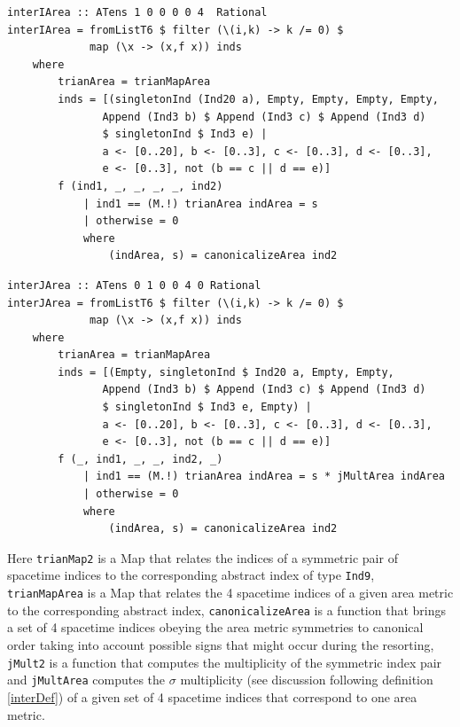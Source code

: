 \documentclass[a4paper,12pt, DIV=14, BCOR=5mm, twoside, headsepline]{scrbook}
\begin{document}
\begin{samepage}
\begin{verbatim}
interIArea :: ATens 1 0 0 0 0 4  Rational
interIArea = fromListT6 $ filter (\(i,k) -> k /= 0) $
             map (\x -> (x,f x)) inds
    where
        trianArea = trianMapArea
        inds = [(singletonInd (Ind20 a), Empty, Empty, Empty, Empty,
               Append (Ind3 b) $ Append (Ind3 c) $ Append (Ind3 d) 
               $ singletonInd $ Ind3 e) |
               a <- [0..20], b <- [0..3], c <- [0..3], d <- [0..3],
               e <- [0..3], not (b == c || d == e)]
        f (ind1, _, _, _, _, ind2)
            | ind1 == (M.!) trianArea indArea = s
            | otherwise = 0
            where
                (indArea, s) = canonicalizeArea ind2
\end{verbatim} 
\end{samepage}

\begin{samepage}
\begin{verbatim}
interJArea :: ATens 0 1 0 0 4 0 Rational
interJArea = fromListT6 $ filter (\(i,k) -> k /= 0) $
             map (\x -> (x,f x)) inds
    where
        trianArea = trianMapArea
        inds = [(Empty, singletonInd $ Ind20 a, Empty, Empty,
               Append (Ind3 b) $ Append (Ind3 c) $ Append (Ind3 d)
               $ singletonInd $ Ind3 e, Empty) |
               a <- [0..20], b <- [0..3], c <- [0..3], d <- [0..3],
               e <- [0..3], not (b == c || d == e)]
        f (_, ind1, _, _, ind2, _)
            | ind1 == (M.!) trianArea indArea = s * jMultArea indArea
            | otherwise = 0
            where
                (indArea, s) = canonicalizeArea ind2
\end{verbatim} 
\end{samepage}

Here \texttt{trianMap2} is a Map that relates the indices of a symmetric pair of spacetime indices to the corresponding abstract index of type \texttt{Ind9}, \texttt{trianMapArea} is a Map that relates the 4 spacetime indices of a given area metric to the corresponding abstract index, \texttt{canonicalizeArea} is a function that brings a set of 4 spacetime indices obeying the area metric symmetries to canonical order taking into account possible signs that might occur during the resorting, \texttt{jMult2} is a function that computes the multiplicity of the symmetric index pair and \texttt{jMultArea} computes the $\sigma$ multiplicity (see discussion following definition \ref{interDef}) of a given set of 4 spacetime indices that correspond to one area metric.
\end{document}
